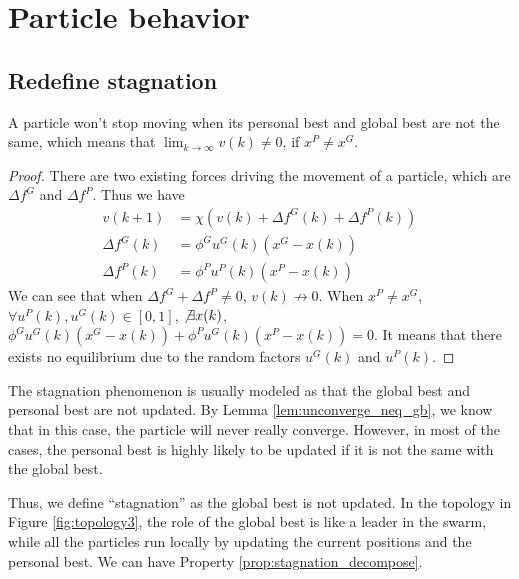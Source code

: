 \section{Particle behavior}

\subsection{Redefine stagnation}

\begin{lemma}
\label{lem:unconverge_neq_gb}
A particle won't stop moving when its personal best and global best are not the same, 
which means that 
$ \lim_{k \rightarrow \infty} v(k) \neq 0 $, if $ x^{P} \neq x^{G} $.
\begin{proof} 
There are two existing forces driving the movement of a particle, which are $ \Delta f^{G} $ and $ \Delta f^{P} $.
Thus we have
\begin{equation}
\begin{array}{lcl}
v(k+1) & = \chi ( v(k) + \Delta f^{G} (k) + \Delta f^{P} (k) ) \\
\Delta f^{G} (k) & = \phi^{G} u^{G} (k) (x^{G} - x(k)) \\
\Delta f^{P} (k) & = \phi^{P} u^{P} (k) (x^{P} - x(k)) 
\end{array}
\end{equation}
We can see that when $ \Delta f^{G} + \Delta f^{P} \neq 0 $, $ v(k)  \not \rightarrow 0 $.
When $ x^{P} \neq x^{G} $, $ \forall u^{P}(k), u^{G}(k) \in [0, 1] $, $ \not \exists x(k) $, $ \phi^{G} u^{G} (k) (x^{G} - x(k)) + \phi^{P} u^{G} (k) (x^{P} - x(k)) = 0 $.
It means that there exists no equilibrium due to the random factors $ u^{G} (k) $ and $ u^{P} (k) $. 
\end{proof}
\end{lemma}

The stagnation phenomenon is usually modeled as that the global best and personal best are not updated.
By Lemma \ref{lem:unconverge_neq_gb}, we know that in this case, the particle will never really converge.
However, in most of the cases, the personal best is highly likely to be updated if it is not the same with the global best.

Thus, we define ``stagnation'' as the global best is not updated.
In the topology in Figure \ref{fig:topology3}, the role of the global best is like a leader in the swarm, while all the particles run locally by updating the current positions and the personal best.
We can have Property \ref{prop:stagnation_decompose}.

